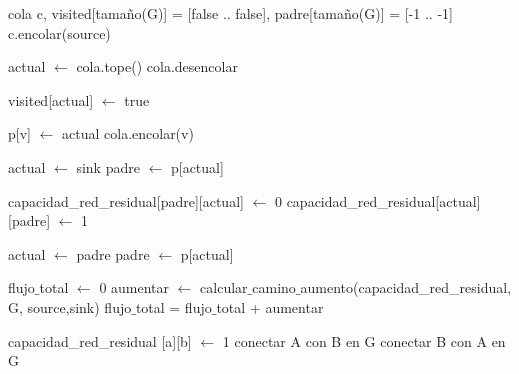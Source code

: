 \begin{algorithmic}
	\State cola c, visited[tamaño(G)] = [false .. false], padre[tamaño(G)] = [-1 .. -1]
	\State c.encolar(source)
	

		\State actual $\leftarrow$ cola.tope()
		\State cola.desencolar
		
		\State visited[actual] $\leftarrow$ true
	
		 
					\State p[v] $\leftarrow$ actual
					\State cola.encolar(v)
				\EndIf
		\EndFor 
	\EndWhile

		\State {} 
	\EndIf

	\State actual $\leftarrow$ sink
	\State padre $\leftarrow$ p[actual]
	
		\State capacidad_red_residual[padre][actual] $\leftarrow$ 0
		\State capacidad_red_residual[actual][padre] $\leftarrow$ 1
		
		\State actual $\leftarrow$ padre
		\State padre $\leftarrow$ p[actual]
	\EndWhile

	\State {} 
\EndFunction
\end{algorithmic}
\hspace{1cm}

\begin{algorithmic}
	\State flujo$\_$total $\leftarrow$ 0
	\Repeat 
			\State aumentar $\leftarrow$ calcular$\_$camino$\_$aumento(capacidad_red_residual, G, source,sink)
			\State flujo$\_$total = flujo$\_$total + aumentar
	
\EndFunction
\end{algorithmic}
\hspace{1cm}

\begin{algorithmic}
	\State capacidad_red_residual [a][b] $\leftarrow$ 1
	\State conectar A con B en G
	\State conectar B con A en G
\EndFunction
\end{algorithmic}
\hspace{1cm}

